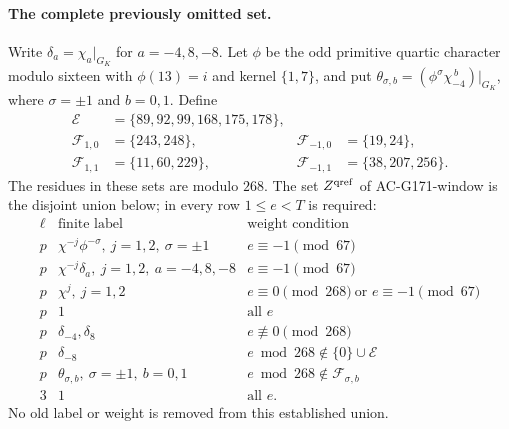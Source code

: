 \paragraph{The complete previously omitted set.}
Write $\delta_a=\chi_a|_{G_K}$ for $a=-4,8,-8$.
Let $\phi$ be the odd primitive quartic character modulo sixteen with
$\phi(13)=i$ and kernel $\{1,7\}$, and put
$\theta_{\sigma,b}=(\phi^\sigma\chi_{-4}^{\,b})|_{G_K}$,
where $\sigma=\pm1$ and $b=0,1$.
Define
\[
 \begin{aligned}
 \mathcal E&=\{89,92,99,168,175,178\},\\
 \mathcal F_{1,0}&=\{243,248\},&\mathcal F_{-1,0}&=\{19,24\},\\
 \mathcal F_{1,1}&=\{11,60,229\},&\mathcal F_{-1,1}&=\{38,207,256\}.
 \end{aligned}
 \tag{TPW.2}
\]
The residues in these sets are modulo $268$.
The set $Z^{\rm qref}$ of AC-G171-window is the disjoint union below;
in every row $1\leq e<T$ is required:
\[
 \begin{array}{c|l|l}
 \ell&\text{finite label}&\text{weight condition}\\ \hline
 p&\chi^{-j}\phi^{-\sigma},\ j=1,2,\ \sigma=\pm1
                    &e\equiv-1\pmod {67}\\
 p&\chi^{-j}\delta_a,\ j=1,2,\ a=-4,8,-8
                    &e\equiv-1\pmod {67}\\
 p&\chi^j,\ j=1,2&e\equiv0\pmod {268}\ \text{or }e\equiv-1\pmod {67}\\
 p&1&\text{all }e\\
 p&\delta_{-4},\delta_8&e\not\equiv0\pmod {268}\\
 p&\delta_{-8}&e\bmod268\notin\{0\}\cup\mathcal E\\
 p&\theta_{\sigma,b},\ \sigma=\pm1,\ b=0,1
                    &e\bmod268\notin\mathcal F_{\sigma,b}\\
 3&1&\text{all }e.
 \end{array}
 \tag{TPW.3}
\]
No old label or weight is removed from this established union.

